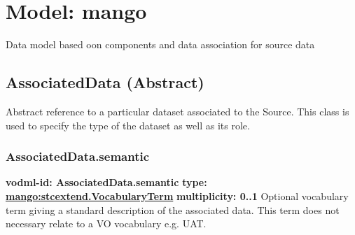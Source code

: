 
%



    
    
    
    
    
    
      

\pagebreak
\section{Model: mango }
  

  Data model based oon components and data association for source data

  \subsection{AssociatedData (Abstract)}
  \label{sect:AssociatedData}
    Abstract reference to a particular dataset associated to the Source. This class is used to specify the type of the dataset as well as its role.

    \subsubsection{AssociatedData.semantic}
      \textbf{vodml-id: AssociatedData.semantic} \newline
      \textbf{type: \hyperref[sect:stcextend.VocabularyTerm]{mango:stcextend.VocabularyTerm}} \newline
      \textbf{multiplicity: 0..1} \newline 
      Optional vocabulary term giving a standard description of the associated data. This term does not necessary relate to a VO vocabulary e.g. UAT.

